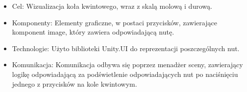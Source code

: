 \begin{itemize}
	\item Cel: Wizualizacja koła kwintowego, wraz z skalą molową i durową.
	\item Komponenty: Elementy graficzne, w postaci przycisków, zawierające komponent image, który zawiera odpowiadającą nutę.
	\item Technologie: Użyto biblioteki Unity.UI do reprezentacji poszczególnych nut.
	\item Komunikacja: Komunikacja odbywa się poprzez menadżer sceny, zawierający logikę odpowiadającą za podświetlenie odpowiadających nut po naciśnięciu jednego z przycisków na kole kwintowym.
\end{itemize}


